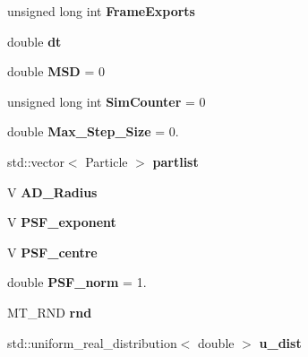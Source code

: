 \begin{DoxyCompactItemize}
\item 
\mbox{\label{classLangevinBox_a9574d3c250e3abfd24e49e29010a66fc}} 
unsigned long int {\bfseries Frame\+Exports}
\item 
\mbox{\label{classLangevinBox_a2f1a319561b14227b86f4ca2193f31a9}} 
double {\bfseries dt}
\item 
\mbox{\label{classLangevinBox_ad507705d4517bb20eea3e16058aac65e}} 
double {\bfseries M\+SD} = 0
\item 
\mbox{\label{classLangevinBox_a73614054243ffa144f6da8a30759ec4b}} 
unsigned long int {\bfseries Sim\+Counter} = 0
\item 
\mbox{\label{classLangevinBox_a7bc5dd727bcc1aaeaf6ca735aee1b736}} 
double {\bfseries Max\+\_\+\+Step\+\_\+\+Size} = 0.
\item 
\mbox{\label{classLangevinBox_a9cd0a5ce15dde93b30da884dee3a44d3}} 
std\+::vector$<$ Particle $>$ {\bfseries partlist}
\item 
\mbox{\label{classLangevinBox_ab6fcd6dd26bde24d63c35927c9767254}} 
V {\bfseries A\+D\+\_\+\+Radius}
\item 
\mbox{\label{classLangevinBox_aa4333b4e899bf5d784acc5a9a66914ff}} 
V {\bfseries P\+S\+F\+\_\+exponent}
\item 
\mbox{\label{classLangevinBox_a2062832890de9cf9cb9af1eba1372b42}} 
V {\bfseries P\+S\+F\+\_\+centre}
\item 
\mbox{\label{classLangevinBox_ae666de6d570ff7a3af5e645bd4b8d0bb}} 
double {\bfseries P\+S\+F\+\_\+norm} = 1.
\item 
\mbox{\label{classLangevinBox_afb4041d6024027cea9248e9b53b30bc8}} 
M\+T\+\_\+\+R\+ND {\bfseries rnd}
\item 
\mbox{\label{classLangevinBox_a30cd03eeb2cbcba1787e8e8260280900}} 
std\+::uniform\+\_\+real\+\_\+distribution$<$ double $>$ {\bfseries u\+\_\+dist}

\end{DoxyCompactItemize}
